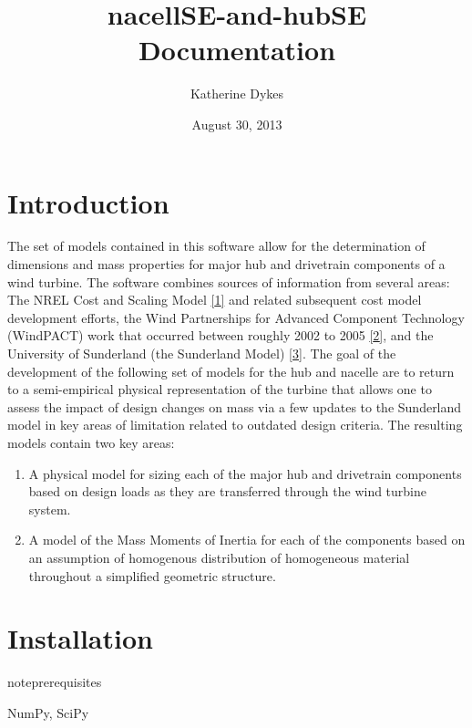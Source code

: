 \documentclass[letterpaper,10pt,openany,oneside]{sphinxmanual}
\title{nacellSE-and-hubSE Documentation}
\date{August 30, 2013}
\author{Katherine Dykes}
\begin{document}
\maketitle
\tableofcontents
{}\label{index::doc}



\chapter{Introduction}
\label{intro:introduction}\label{intro:nacellese-and-hubse}\label{intro::doc}
The set of models contained in this software allow for the determination of dimensions and mass properties for major hub and drivetrain components of a wind turbine.  The software combines sources of information from several areas: The NREL Cost and Scaling Model {\hyperref[theory:1]{{[}1{]}}} and related subsequent cost model development efforts, the Wind Partnerships for Advanced Component Technology (WindPACT) work that occurred between roughly 2002 to 2005 {\hyperref[theory:2]{{[}2{]}}}, and the University of Sunderland (the Sunderland Model) {\hyperref[theory:3]{{[}3{]}}}.  The goal of the development of the following set of models for the hub and nacelle are to return to a semi-empirical physical representation of the turbine that allows one to assess the impact of design changes on mass via a few updates to the Sunderland model in key areas of limitation related to outdated design criteria.  The resulting models contain two key areas:
\begin{enumerate}
\item {} 
A physical model for sizing each of the major hub and drivetrain components based on design loads as they are transferred through the wind turbine system.

\item {} 
A model of the Mass Moments of Inertia for each of the components based on an assumption of homogenous distribution of homogeneous material throughout a simplified geometric structure.

\end{enumerate}


\chapter{Installation}
\label{installation:installation}\label{installation::doc}
\begin{notice}{note}{prerequisites}

NumPy, SciPy
\end{notice}
\end{document}
